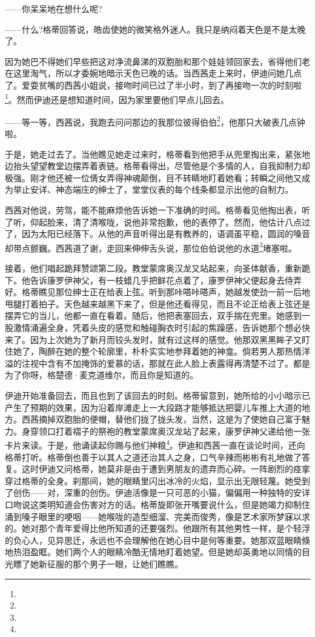 \par ——你呆呆地在想什么呢?
\par ——什么?格蒂回答说，皓齿使她的微笑格外迷人。我只是纳闷着天色是不是太晚了。
\par 因为她巴不得她们早些把这对净流鼻涕的双胞胎和那个娃娃领回家去，省得他们老在这里淘气，所以才委婉地暗示天色已晚的话。当西茜走上来时，伊迪问她几点了。爱耍贫嘴的西茜小姐说，接吻时间已过了半小时，到了再接吻一次的时刻啦\footnote{}。然而伊迪还是想知道时间，因为家里要他们早点儿回去。
\par ——等一等，西茜说，我跑去问问那边的我那位彼得伯伯\footnote{}，他那只大破表几点钟啦。
\par 于是，她走过去了。当他瞧见她走过来时，格蒂看到他把手从兜里掏出来，紧张地边抬头望望教堂边摆弄着表链。格蒂看得出，尽管他是个多情的人，自我抑制力却极强。刚才他还被一位倩女弄得神魂颠倒，目不转睛地盯着她看；转瞬之间他又成为举止安详、神态端庄的绅士了，堂堂仪表的每个线条都显示出他的自制力。
\par 西茜对他说，劳驾，能不能麻烦他告诉她一下准确的时间。格蒂看见他掏出表，听了听，仰起脸来，清了清喉咙，说他非常抱歉，他的表停了。然而，他估计八点过了，因为太阳已经落下。从他的声音听得出是有教养的，语调虽平稳，圆润的嗓音却带点颤巍。西茜道了谢，走回来伸伸舌头说，那位伯伯说他的水道\footnote{}堵塞啦。
\par 接着，他们唱起跪拜赞颂第二段。教堂蒙席奥汉龙又站起来，向圣体献香，重新跪下。他告诉康罗伊神父，有一枝蜡几乎把鲜花点着了，康罗伊神父便起身去侍弄好。格蒂瞧见那位绅士正在给表上弦。听到那咔嗒咔嗒声，她越发使劲一前一后地甩腿打着拍子。天色越来越黑下来了，但是他还看得见，而且不论正给表上弦还是摆弄它的当儿，他都一直在看着。随后，他把表塞回去，双手揣在兜里。她感到一股激情涌遍全身，凭着头皮的感觉和触碰胸衣时引起的焦躁感，告诉她那个想必快来了。因为上次她为了新月而铰头发时，就有过这样的感觉。他那双黑黑眸子又盯住她了，陶醉在她的整个轮廓里，朴朴实实地参拜着她的神龛。倘若男人那热情洋溢的注视中含有不加掩饰的爱慕的话，那就在此人脸上表露得再清楚不过了。都是为了你呀，格楚德·麦克道维尔，而且你是知道的。
\par 伊迪开始准备回去，而且也到了该回去的时刻。格蒂留意到，她所给的小小暗示已产生了预期的效果，因为沿着岸滩走上一大段路才能够抵达把婴儿车推上大道的地方。西茜摘掉双胞胎的便帽，替他们拢了拢头发，当然，这是为了使她自己富于魅力。身穿领口打着褶子的祭袍的教堂蒙席奥汉龙站了起来，康罗伊神父递给他一张卡片来读。于是，他诵读起你赐与他们神粮\footnote{}。伊迪和西茜一直在谈论时间，还向格蒂打听。格蒂倒也善于以其人之道还治其人之身，口气辛辣而彬彬有礼地做了答复。这时伊迪又问格蒂，她莫非是由于遭到男朋友的遗弃而心碎。一阵剧烈的痉挛穿过格蒂的全身。刹那间，她的眼睛里闪出冰冷的火焰，显示出无限轻蔑。她受到了创伤——对，深重的创伤。伊迪活像是一只可恶的小猫，偏偏用一种独特的安详口吻说这类明知道会伤害对方的话。格蒂旋即张开嘴要说什么，但是她竭力抑制住涌到嗓子眼里的哽咽——她喉咙的造型细溜、完美而俊秀，像是艺术家所梦寐以求的。她对那个青年爱得比他所知道的还要强烈。他跟所有其他男性一样，是个轻浮的负心人，见异思迁，永远也不会理解他在她心目中是何等重要。她那双蓝眼睛倏地热泪盈眶。她们两个人的眼睛冷酷无情地盯着她望。但是她却英勇地以同情的目光瞟了她新征服的那个男子一眼，让她们瞧瞧。
